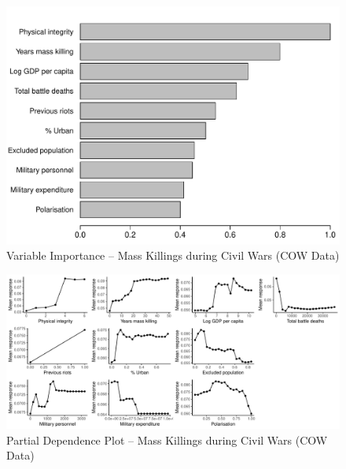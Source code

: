 \documentclass[a4paper,12pt]{article}
\begin{document}
\begin{figure}[H]
    \centering
    \includegraphics{images/rf-cow.pdf}
    \caption{Variable Importance -- Mass Killings during Civil Wars (COW Data)}
    \label{fig:rf-mk-ucdp}
\end{figure}

\newpage 

\begin{figure}[H]
    \centering
    \includegraphics[width=.98\textheight,angle=90]{images/rf-cow-pd.pdf}
    \caption{Partial Dependence Plot -- Mass Killings during Civil Wars (COW Data)}
    \label{fig:rf-mk-ucdp-pd}
\end{figure}
\end{document}
